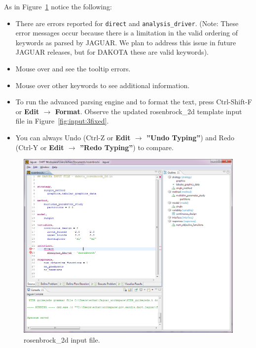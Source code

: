 As in Figure~\ref{fig:input:2rosenbrockfile} notice the following:
\begin{itemize}      
\item There are errors reported for \texttt{direct} and
  \texttt{analysis\_driver}. (Note: These error messages occur because
  there is a limitation in the valid ordering of keywords as parsed by
  JAGUAR. We plan to address this issue in future JAGUAR releases, but
  for DAKOTA these are valid keywords).
\item Mouse over and see the tooltip errors.
\item Mouse over other keywords to see additional information.
\item To run the advanced parsing engine and to format the text, press
  Ctrl-Shift-F or {\bf Edit $\rightarrow$ Format}. Observe the updated
  rosenbrock\_2d template input file in Figure~\ref{fig:input:3fixed}.
\item You can always Undo (Ctrl-Z or {\bf Edit $\rightarrow$ ''Undo
  Typing''}) and Redo (Ctrl-Y or {\bf Edit $\rightarrow$ ''Redo
  Typing''}) to compare.
\end{itemize}
\begin{figure}[htbp]
  \centering
  \includegraphics[scale=0.6]{images/2rosenbrockfile}
  \caption{rosenbrock\_2d input file.}
  \label{fig:input:2rosenbrockfile}
\end{figure}

